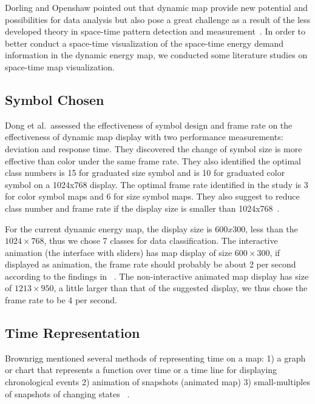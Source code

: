 Dorling and Openshaw pointed out that dynamic map provide new
potential and possibilities for data analysis but also pose a great
challenge as a result of the less developed theory in space-time
pattern detection and measurement~\cite{Dorling1992}. In order to
better conduct a space-time visualization of the space-time energy
demand information in the dynamic energy map, we conducted some
literature studies on space-time map visualization.

\subsection{Symbol Chosen}\label{symbolChosen}
Dong et al.\ assessed the effectiveness of symbol design and frame
rate on the effectiveness of dynamic map display with two performance
measurements: deviation and response time. They discovered the change
of symbol size is more effective than color under the same frame
rate. They also identified the optimal class numbers is 15 for
graduated size symbol and is 10 for graduated color symbol on a
1024x768 display. The optimal frame rate identified in the study is 3
for color symbol maps and 6 for size symbol maps. They also suggest to
reduce class number and frame rate if the display size is smaller than
1024x768~\cite{doi:10.1559/1523040639298}. 

For the current dynamic energy map, the display size is $600 x 300$,
less than the $1024 \times 768$, thus we chose 7 classes for data
classification. The interactive animation (the interface with sliders)
has map display of size $600 \times 300$, if displayed as animation,
the frame rate should probably be about 2 per second according to the
findings in ~\cite{doi:10.1559/1523040639298}. The non-interactive
animated map display has size of $1213 \times 950$, a little larger
than that of the suggested display, we thus chose the frame rate to be
4 per second.

\subsection{Time Representation}\label{timeRepresent}
Brownrigg mentioned several methods of representing time on a map: 1)
a graph or chart that represents a function over time or a time line
for displaying chronological events 2) animation of snapshots
(animated map) 3) small-multiples of snapshots of changing states
~\cite{Brownrigg2005}.

